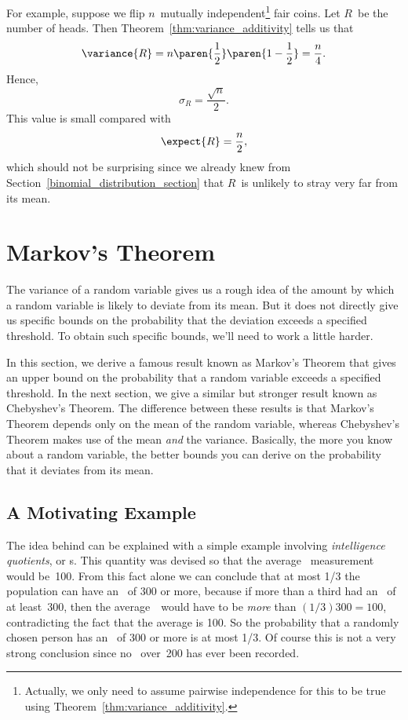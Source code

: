 For example, suppose we flip $n$~mutually
independent\footnote{Actually, we only need to assume pairwise
  independence for this to be true using
  Theorem~\ref{thm:variance_additivity}.} fair coins.  Let $R$~be the
number of heads.  Then Theorem~\ref{thm:variance_additivity} tells us
that
\begin{equation*}
    \variance{R} = n \paren{\frac{1}{2}} \paren{1 - \frac{1}{2}}
                 = \frac{n}{4}.
\end{equation*}
Hence,
\begin{equation*}
    \sigma_R = \frac{\sqrt{n}}{2}.
\end{equation*}
This value is small compared with
\begin{equation*}
    \expect{R} = \frac{n}{2},
\end{equation*}
which should not be surprising since we already knew from
Section~\ref{binomial_distribution_section} that $R$~is unlikely to
stray very far from its mean.

\section{Markov's Theorem}

The variance of a random variable gives us a rough idea of the amount
by which a random variable is likely to deviate from its mean.  But it
does not directly give us specific bounds on the probability that the
deviation exceeds a specified threshold.  To obtain such specific
bounds, we'll need to work a little harder.

In this section, we derive a famous result known as Markov's Theorem
that gives an upper bound on the probability that a random variable
exceeds a specified threshold.  In the next section, we give a similar
but stronger result known as Chebyshev's Theorem.  The difference
between these results is that Markov's Theorem depends only on the
mean of the random variable, whereas Chebyshev's Theorem makes use of
the mean \emph{and} the variance.  Basically, the more you know about
a random variable, the better bounds you can derive on the probability
that it deviates from its mean.

\subsection{A Motivating Example}


The idea behind  can be explained with a simple
example involving \emph{intelligence quotients}, or \IQ s.  This
quantity was devised so that the average \IQ\ measurement would
be~100.  From this fact alone we can conclude that at most 1/3 the
population can have an \IQ\ of 300 or more, because if more than a
third had an \IQ\ of at least~300, then the average~\IQ\ would have to
be \emph{more} than $(1/3)300 = 100$, contradicting the fact that the
average is 100.  So the probability that a randomly chosen person has
an \IQ\ of 300 or more is at most 1/3.  Of course this is not a very
strong conclusion since no \IQ\ over~200 has ever been recorded.

